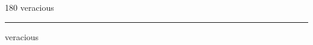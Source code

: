 
\begin{frame}
\begin{center}
\begin{turn}{180}
{\fontsize{2.5cm}{1em}\selectfont veracious}
\end{turn}
\vspace{1em}\par  
\hrule
\vspace{1em}\par  
{\fontsize{2.5cm}{1em}\selectfont veracious}
\end{center}
\end{frame}
